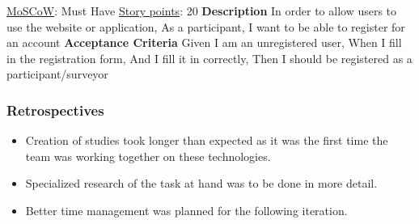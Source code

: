 \documentclass[12pt, a4paper]{report}
\begin{document}
\begin{tcolorbox}[width=\textwidth,colback={White},title={\textbf {Register}},colbacktitle=grey,coltitle=black]
\underline{MoSCoW}: Must Have 
\hfill
\underline {Story points}: 20
\newline
\newline
\blindtext \textbf{Description}
\newline
In order to allow users to use the website or application,
\newline
As a participant,
\newline
I want to be able to register for an account
\newline
\newline
 \textbf{Acceptance Criteria}
\newline
Given I am an unregistered user,\newline
When I fill in the registration form,\newline
And I fill it in correctly,\newline
Then I should be registered as a participant/surveyor
\end{tcolorbox} 

\subsubsection{Retrospectives}
\begin{itemize}
    \item Creation of studies took longer than expected as it was the first time the team was working together on these technologies.
    \item Specialized research of the task at hand was to be done in more detail. 
    \item Better time management was planned for the following iteration.
\end{itemize}
\end{document}
